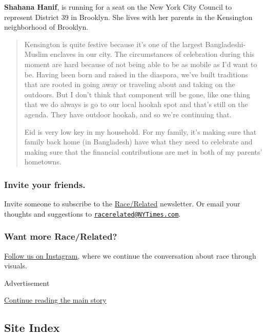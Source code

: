 \textbf{Shahana Hanif}, is running for a seat on the New York City
Council to represent District 39 in Brooklyn. She lives with her parents
in the Kensington neighborhood of Brooklyn.

\begin{quote}
Kensington is quite festive because it's one of the largest
Bangladeshi-Muslim enclaves in our city. The circumstances of
celebration during this moment are hard because of not being able to be
as mobile as I'd want to be. Having been born and raised in the
diaspora, we've built traditions that are rooted in going away or
traveling about and taking on the outdoors. But I don't think that
component will be gone, like one thing that we do always is go to our
local hookah spot and that's still on the agenda. They have outdoor
hookah, and so we're continuing that.

Eid is very low key in my household. For my family, it's making sure
that family back home (in Bangladesh) have what they need to celebrate
and making sure that the financial contributions are met in both of my
parents' hometowns.
\end{quote}

\hypertarget{invite-your-friends}{%
\subsubsection{\texorpdfstring{\textbf{Invite your
friends.}}{Invite your friends.}}\label{invite-your-friends}}

Invite someone to subscribe to the
\href{https://www.nytimes3xbfgragh.onion/newsletters/race-related?te=1\&nl=race-related\&emc=edit_rr_20190628}{Race/Related}
newsletter. Or email your thoughts and suggestions to
\href{mailto:racerelated@NYTimes.com}{\nolinkurl{racerelated@NYTimes.com}}.

\hypertarget{want-more-racerelated}{%
\subsubsection{\texorpdfstring{\textbf{Want more
Race/Related?}}{Want more Race/Related?}}\label{want-more-racerelated}}

\href{http://instagram.com/racerelatednyt}{Follow us on Instagram},
where we continue the conversation about race through visuals.

Advertisement

\protect\hyperlink{after-bottom}{Continue reading the main story}

\hypertarget{site-index}{%
\subsection{Site Index}\label{site-index}}

